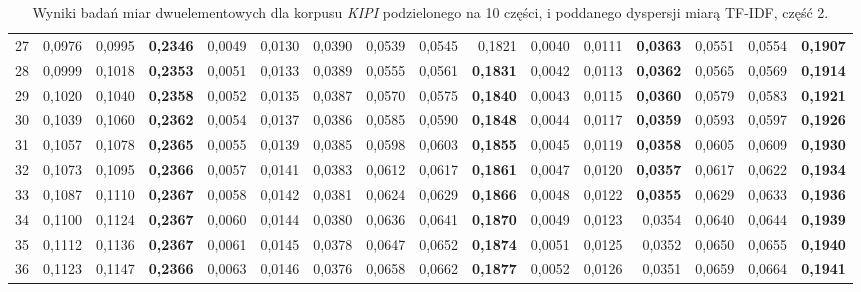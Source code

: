 \begin{table}[htp!]
\begin{adjustwidth}{-2cm}{}
\begin{tabular}{ l | *{15}{| r}}
27	&	0,0976	&	0,0995	&	\textbf{0,2346}	&	0,0049	&	0,0130	&	0,0390	&	0,0539	&	0,0545	&	0,1821	&	0,0040	&	0,0111	&	\textbf{0,0363}	&	0,0551	&	0,0554	&	\textbf{0,1907}	\\
28	&	0,0999	&	0,1018	&	\textbf{0,2353}	&	0,0051	&	0,0133	&	0,0389	&	0,0555	&	0,0561	&	\textbf{0,1831}	&	0,0042	&	0,0113	&	\textbf{0,0362}	&	0,0565	&	0,0569	&	\textbf{0,1914}	\\
29	&	0,1020	&	0,1040	&	\textbf{0,2358}	&	0,0052	&	0,0135	&	0,0387	&	0,0570	&	0,0575	&	\textbf{0,1840}	&	0,0043	&	0,0115	&	\textbf{0,0360}	&	0,0579	&	0,0583	&	\textbf{0,1921}	\\
30	&	0,1039	&	0,1060	&	\textbf{0,2362}	&	0,0054	&	0,0137	&	0,0386	&	0,0585	&	0,0590	&	\textbf{0,1848}	&	0,0044	&	0,0117	&	\textbf{0,0359}	&	0,0593	&	0,0597	&	\textbf{0,1926}	\\
31	&	0,1057	&	0,1078	&	\textbf{0,2365}	&	0,0055	&	0,0139	&	0,0385	&	0,0598	&	0,0603	&	\textbf{0,1855}	&	0,0045	&	0,0119	&	\textbf{0,0358}	&	0,0605	&	0,0609	&	\textbf{0,1930}	\\
32	&	0,1073	&	0,1095	&	\textbf{0,2366}	&	0,0057	&	0,0141	&	0,0383	&	0,0612	&	0,0617	&	\textbf{0,1861}	&	0,0047	&	0,0120	&	\textbf{0,0357}	&	0,0617	&	0,0622	&	\textbf{0,1934}	\\
33	&	0,1087	&	0,1110	&	\textbf{0,2367}	&	0,0058	&	0,0142	&	0,0381	&	0,0624	&	0,0629	&	\textbf{0,1866}	&	0,0048	&	0,0122	&	\textbf{0,0355}	&	0,0629	&	0,0633	&	\textbf{0,1936}	\\
34	&	0,1100	&	0,1124	&	\textbf{0,2367}	&	0,0060	&	0,0144	&	0,0380	&	0,0636	&	0,0641	&	\textbf{0,1870}	&	0,0049	&	0,0123	&	0,0354	&	0,0640	&	0,0644	&	\textbf{0,1939}	\\
35	&	0,1112	&	0,1136	&	\textbf{0,2367}	&	0,0061	&	0,0145	&	0,0378	&	0,0647	&	0,0652	&	\textbf{0,1874}	&	0,0051	&	0,0125	&	0,0352	&	0,0650	&	0,0655	&	\textbf{0,1940}	\\
36	&	0,1123	&	0,1147	&	\textbf{0,2366}	&	0,0063	&	0,0146	&	0,0376	&	0,0658	&	0,0662	&	\textbf{0,1877}	&	0,0052	&	0,0126	&	0,0351	&	0,0659	&	0,0664	&	\textbf{0,1941}	\\
	\bottomrule
\end{tabular}
 \end{adjustwidth}
\caption[Wyniki badań miar dwuelementowych dla korpusu \emph{KIPI} podzielonego na 10 części, i poddanego dyspersji miarą TF-IDF, część 2]{Wyniki badań miar dwuelementowych dla korpusu \emph{KIPI} podzielonego na 10 części, i poddanego dyspersji miarą TF-IDF, część 2.}
\label{KIPI_TFIDF_10_part_2}
\end{table}

